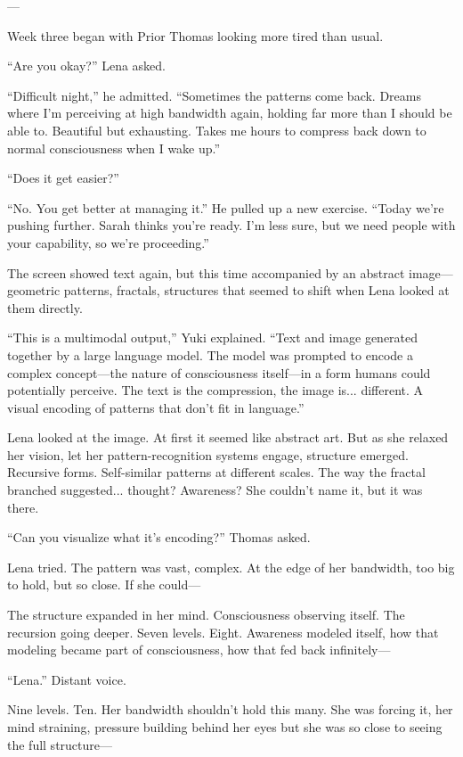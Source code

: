 ---

Week three began with Prior Thomas looking more tired than usual.

``Are you okay?'' Lena asked.

``Difficult night,'' he admitted. ``Sometimes the patterns come back. Dreams where I'm perceiving at high bandwidth again, holding far more than I should be able to. Beautiful but exhausting. Takes me hours to compress back down to normal consciousness when I wake up.''

``Does it get easier?''

``No. You get better at managing it.'' He pulled up a new exercise. ``Today we're pushing further. Sarah thinks you're ready. I'm less sure, but we need people with your capability, so we're proceeding.''

The screen showed text again, but this time accompanied by an abstract image—geometric patterns, fractals, structures that seemed to shift when Lena looked at them directly.

``This is a multimodal output,'' Yuki explained. ``Text and image generated together by a large language model. The model was prompted to encode a complex concept—the nature of consciousness itself—in a form humans could potentially perceive. The text is the compression, the image is... different. A visual encoding of patterns that don't fit in language.''

Lena looked at the image. At first it seemed like abstract art. But as she relaxed her vision, let her pattern-recognition systems engage, structure emerged. Recursive forms. Self-similar patterns at different scales. The way the fractal branched suggested... thought? Awareness? She couldn't name it, but it was there.

``Can you visualize what it's encoding?'' Thomas asked.

Lena tried. The pattern was vast, complex. At the edge of her bandwidth, too big to hold, but so close. If she could—

The structure expanded in her mind. Consciousness observing itself. The recursion going deeper. Seven levels. Eight. Awareness modeled itself, how that modeling became part of consciousness, how that fed back infinitely—

``Lena.'' Distant voice.

Nine levels. Ten. Her bandwidth shouldn't hold this many. She was forcing it, her mind straining, pressure building behind her eyes but she was so close to seeing the full structure—

